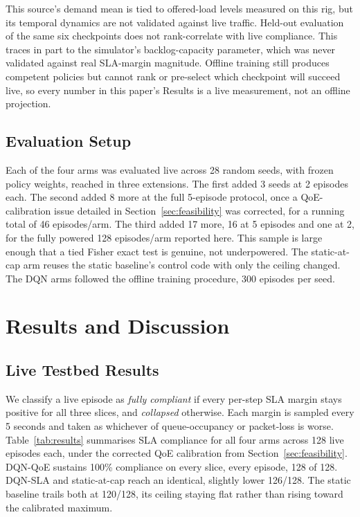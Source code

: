 \documentclass[10pt]{article}
\begin{document}
This source's demand mean is tied to offered-load levels measured on
this rig, but its temporal dynamics are not validated against live
traffic. Held-out evaluation of the
same six checkpoints does not rank-correlate with live compliance.
This traces in part to the
simulator's backlog-capacity parameter, which was never validated
against real SLA-margin magnitude. Offline training still produces competent policies but
cannot rank or pre-select which checkpoint will succeed live, so
every number in this paper's Results is a live measurement, not
an offline projection.

\subsection{Evaluation Setup}
Each of the four arms was evaluated live across 28 random seeds, with
frozen policy weights, reached in three extensions. The first added 3
seeds at 2 episodes each. The second added 8 more at the full
5-episode protocol, once a QoE-calibration issue detailed in
Section~\ref{sec:feasibility} was corrected, for a running total of
46 episodes/arm. The third added 17
more, 16 at 5 episodes and one at 2, for the fully powered 128
episodes/arm reported here. This sample is large enough that a tied
Fisher exact test is genuine, not underpowered. The static-at-cap arm reuses the
static baseline's control code with only the ceiling changed. The
DQN arms followed the offline training procedure, 300 episodes per seed.

\section{Results and Discussion}
\subsection{Live Testbed Results}
\label{sec:live-results}
We classify a live episode as \emph{fully compliant} if every
per-step SLA margin stays positive for all three slices, and
\emph{collapsed} otherwise. Each margin is sampled every 5 seconds
and taken as whichever of queue-occupancy or packet-loss is worse.
Table~\ref{tab:results}
summarises SLA compliance for all four arms across 128 live episodes
each, under the corrected QoE calibration from
Section~\ref{sec:feasibility}. DQN-QoE sustains 100\% compliance on
every slice, every episode, 128 of 128. DQN-SLA and
static-at-cap reach an identical, slightly lower 126/128. The
static baseline trails both at 120/128, its ceiling staying flat
rather than rising toward the calibrated maximum.
\end{document}
